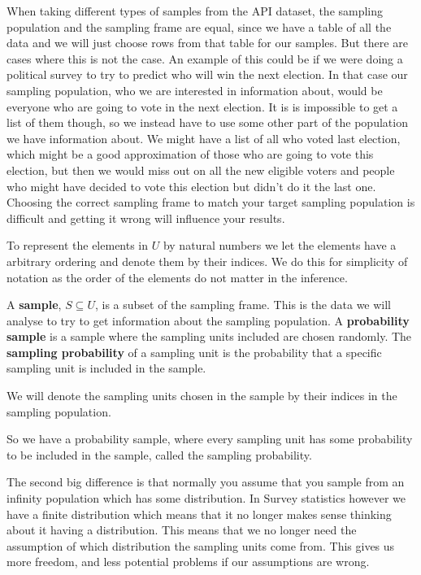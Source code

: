 \documentclass{article}
\begin{document}
When taking different types of samples from the API dataset, the sampling population and the sampling frame are equal, since
we have a table of all the data and we will just choose rows from that table for
our samples. But there are cases where this is not the case. An example of this
could be if we were doing a political survey to try to predict who will win the
next election.
In that case our sampling population, who we are interested in information
about, would be everyone who are going to vote in the next election. It is
is impossible to get a list of them though, so we instead have to use 
some other part of the population we have information about. We might have a
list of all who voted last election, which might be a good approximation of
those who are going to vote this election, but then we would miss out on all the
new eligible voters and people who might have decided to vote this election but
didn't do it the last one.
Choosing the correct sampling frame to match your target sampling population is
difficult and getting it wrong will influence your results.

To represent the elements in \(U\) by natural numbers we let the elements
have a arbitrary ordering and denote them by their indices. We do this for
simplicity of notation as the order of the elements do not matter in the inference.


\begin{definition} \label{def:sample}
A \textbf{sample}, \(S \subseteq U\), is a subset of the sampling frame. This is the data we will analyse to try to get information about the sampling population.
A \textbf{probability sample} is a sample where the sampling units included are chosen randomly.
The \textbf{sampling probability} of a sampling unit is the probability that a specific sampling unit is included in the sample.
\end{definition}

We will denote the sampling units chosen in the sample by their indices in the
sampling population.

So we have a probability sample, where every sampling unit has some probability to be included in the sample, called the sampling probability.

\vspace{5mm}

The second big difference is that normally you assume that you sample from an
infinity population which has some distribution. In Survey statistics however we
have a finite distribution which means that it no longer makes sense thinking
about it having a distribution. This means that we no longer need the assumption
of which distribution the sampling units come from. This gives us more freedom,
and less potential problems if our assumptions are wrong.
\end{document}
